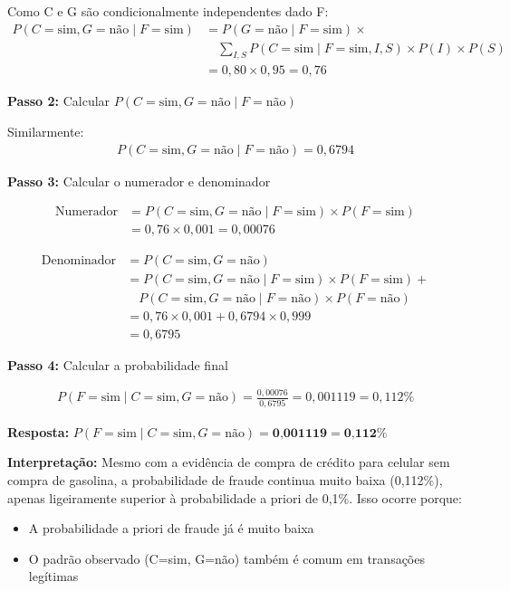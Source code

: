 \documentclass[a4paper,12pt]{article}
\begin{document}
Como C e G são condicionalmente independentes dado F:
\begin{align}
P(C=\text{sim}, G=\text{não} \mid F=\text{sim}) &= P(G=\text{não} \mid F=\text{sim}) \times \nonumber \\
&\quad \sum_{I,S} P(C=\text{sim} \mid F=\text{sim},I,S) \times P(I) \times P(S) \nonumber \\
&= 0,80 \times 0,95 = 0,76
\end{align}

\textbf{Passo 2:} Calcular $P(C=\text{sim}, G=\text{não} \mid F=\text{não})$

Similarmente:
\begin{align}
P(C=\text{sim}, G=\text{não} \mid F=\text{não}) = 0,6794
\end{align}

\textbf{Passo 3:} Calcular o numerador e denominador

\begin{align}
\text{Numerador} &= P(C=\text{sim}, G=\text{não} \mid F=\text{sim}) \times P(F=\text{sim}) \nonumber \\
&= 0,76 \times 0,001 = 0,00076
\end{align}

\begin{align}
\text{Denominador} &= P(C=\text{sim}, G=\text{não}) \nonumber \\
&= P(C=\text{sim}, G=\text{não} \mid F=\text{sim}) \times P(F=\text{sim}) + \nonumber \\
& \quad P(C=\text{sim}, G=\text{não} \mid F=\text{não}) \times P(F=\text{não}) \nonumber \\
&= 0,76 \times 0,001 + 0,6794 \times 0,999 \nonumber \\
&= 0,6795
\end{align}

\textbf{Passo 4:} Calcular a probabilidade final

\begin{align}
P(F=\text{sim} \mid C=\text{sim}, G=\text{não}) = \frac{0,00076}{0,6795} = 0,001119 = 0,112\%
\end{align}

\textbf{Resposta:} $P(F=\text{sim} \mid C=\text{sim}, G=\text{não}) = \textbf{0,001119} = \textbf{0,112\%}$

\textbf{Interpretação:} Mesmo com a evidência de compra de crédito para celular sem compra de gasolina, a probabilidade de fraude continua muito baixa (0,112\%), apenas ligeiramente superior à probabilidade a priori de 0,1\%. Isso ocorre porque:
\begin{itemize}
    \item A probabilidade a priori de fraude já é muito baixa
    \item O padrão observado (C=sim, G=não) também é comum em transações legítimas
\end{itemize}
\end{document}
